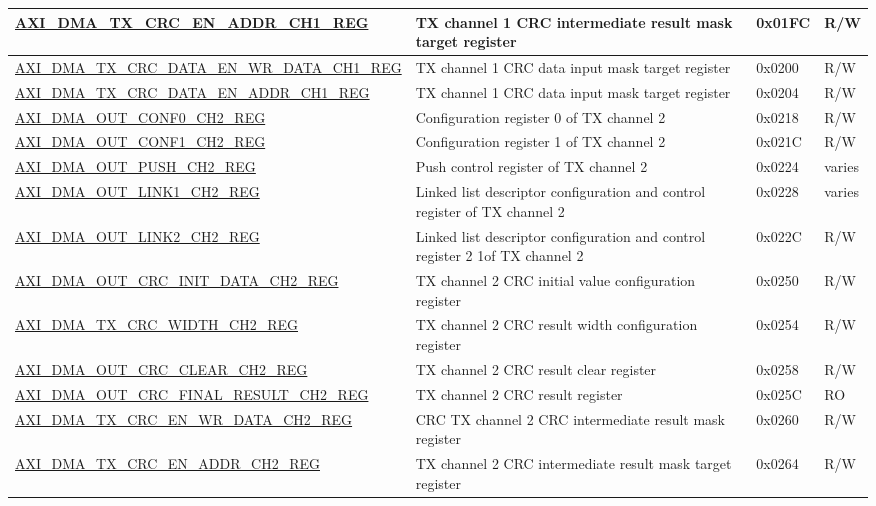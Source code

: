 \begin{longtable}{ | l | p{10cm} | p{1.3cm} | l | }
\hyperref[regdesc:AXIDMATXCRCENADDRCHNREG]{AXI\_DMA\_TX\_CRC\_EN\_ADDR\_CH1\_REG} & TX channel 1 CRC intermediate result mask target register & 0x01FC & R/W \\ \hline
\hyperref[regdesc:AXIDMATXCRCDATAENWRDATACHNREG]{AXI\_DMA\_TX\_CRC\_DATA\_EN\_WR\_DATA\_CH1\_REG} & TX channel 1 CRC data input mask target register & 0x0200 & R/W \\ \hline
\hyperref[regdesc:AXIDMATXCRCDATAENADDRCHNREG]{AXI\_DMA\_TX\_CRC\_DATA\_EN\_ADDR\_CH1\_REG} & TX channel 1 CRC data input mask target register & 0x0204 & R/W \\ \hline
\hyperref[regdesc:AXIDMAOUTCONF0CHNREG]{AXI\_DMA\_OUT\_CONF0\_CH2\_REG} & Configuration register 0 of TX channel 2 & 0x0218 & R/W \\ \hline
\hyperref[regdesc:AXIDMAOUTCONF1CHNREG]{AXI\_DMA\_OUT\_CONF1\_CH2\_REG} & Configuration register 1 of TX channel 2 & 0x021C & R/W \\ \hline
\hyperref[regdesc:AXIDMAOUTPUSHCHNREG]{AXI\_DMA\_OUT\_PUSH\_CH2\_REG} & Push control register of TX channel 2 & 0x0224 & varies \\ \hline
\hyperref[regdesc:AXIDMAOUTLINK1CHNREG]{AXI\_DMA\_OUT\_LINK1\_CH2\_REG} & Linked list descriptor configuration and control register of TX channel 2 & 0x0228 & varies \\ \hline
\hyperref[regdesc:AXIDMAOUTLINK2CHNREG]{AXI\_DMA\_OUT\_LINK2\_CH2\_REG} & Linked list descriptor configuration and control register 2 1of TX channel 2 & 0x022C & R/W \\ \hline
\hyperref[regdesc:AXIDMAOUTCRCINITDATACHNREG]{AXI\_DMA\_OUT\_CRC\_INIT\_DATA\_CH2\_REG} & TX channel 2 CRC initial value configuration register & 0x0250 & R/W \\ \hline
\hyperref[regdesc:AXIDMATXCRCWIDTHCHNREG]{AXI\_DMA\_TX\_CRC\_WIDTH\_CH2\_REG} & TX channel 2 CRC result width configuration register & 0x0254 & R/W \\ \hline
\hyperref[regdesc:AXIDMAOUTCRCCLEARCHNREG]{AXI\_DMA\_OUT\_CRC\_CLEAR\_CH2\_REG} & TX channel 2 CRC result clear register & 0x0258 & R/W \\ \hline
\hyperref[regdesc:AXIDMAOUTCRCFINALRESULTCHNREG]{AXI\_DMA\_OUT\_CRC\_FINAL\_RESULT\_CH2\_REG} & TX channel 2 CRC result register & 0x025C & RO \\ \hline
\hyperref[regdesc:AXIDMATXCRCENWRDATACHNREG]{AXI\_DMA\_TX\_CRC\_EN\_WR\_DATA\_CH2\_REG} & CRC TX channel 2 CRC intermediate result mask register & 0x0260 & R/W \\ \hline
\hyperref[regdesc:AXIDMATXCRCENADDRCHNREG]{AXI\_DMA\_TX\_CRC\_EN\_ADDR\_CH2\_REG} & TX channel 2 CRC intermediate result mask target register & 0x0264 & R/W \\ \hline

\end{longtable}
